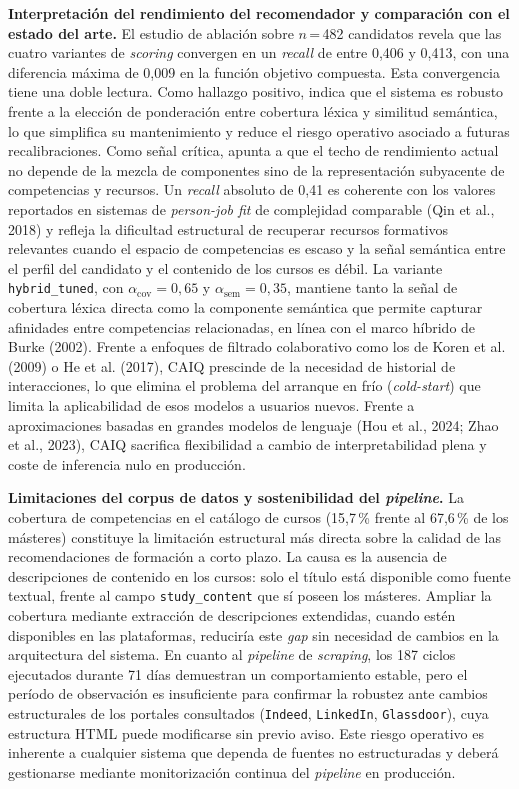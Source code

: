 \textbf{Interpretación del rendimiento del recomendador y comparación con el estado del arte.} El estudio de ablación sobre $n$\,=\,482 candidatos revela que las cuatro variantes de \textit{scoring} convergen en un \textit{recall} de entre 0,406 y 0,413, con una diferencia máxima de 0,009 en la función objetivo compuesta. Esta convergencia tiene una doble lectura. Como hallazgo positivo, indica que el sistema es robusto frente a la elección de ponderación entre cobertura léxica y similitud semántica, lo que simplifica su mantenimiento y reduce el riesgo operativo asociado a futuras recalibraciones. Como señal crítica, apunta a que el techo de rendimiento actual no depende de la mezcla de componentes sino de la representación subyacente de competencias y recursos. Un \textit{recall} absoluto de 0,41 es coherente con los valores reportados en sistemas de \textit{person-job fit} de complejidad comparable (Qin et al., 2018) y refleja la dificultad estructural de recuperar recursos formativos relevantes cuando el espacio de competencias es escaso y la señal semántica entre el perfil del candidato y el contenido de los cursos es débil. La variante \texttt{hybrid\_tuned}, con $\alpha_{\text{cov}}=0{,}65$ y $\alpha_{\text{sem}}=0{,}35$, mantiene tanto la señal de cobertura léxica directa como la componente semántica que permite capturar afinidades entre competencias relacionadas, en línea con el marco híbrido de Burke (2002). Frente a enfoques de filtrado colaborativo como los de Koren et al. (2009) o He et al. (2017), CAIQ prescinde de la necesidad de historial de interacciones, lo que elimina el problema del arranque en frío (\textit{cold-start}) que limita la aplicabilidad de esos modelos a usuarios nuevos. Frente a aproximaciones basadas en grandes modelos de lenguaje (Hou et al., 2024; Zhao et al., 2023), CAIQ sacrifica flexibilidad a cambio de interpretabilidad plena y coste de inferencia nulo en producción.

\textbf{Limitaciones del corpus de datos y sostenibilidad del \textit{pipeline}.} La cobertura de competencias en el catálogo de cursos (15,7\,\% frente al 67,6\,\% de los másteres) constituye la limitación estructural más directa sobre la calidad de las recomendaciones de formación a corto plazo. La causa es la ausencia de descripciones de contenido en los cursos: solo el título está disponible como fuente textual, frente al campo \texttt{study\_content} que sí poseen los másteres. Ampliar la cobertura mediante extracción de descripciones extendidas, cuando estén disponibles en las plataformas, reduciría este \textit{gap} sin necesidad de cambios en la arquitectura del sistema. En cuanto al \textit{pipeline} de \textit{scraping}, los 187 ciclos ejecutados durante 71 días demuestran un comportamiento estable, pero el período de observación es insuficiente para confirmar la robustez ante cambios estructurales de los portales consultados (\texttt{Indeed}, \texttt{LinkedIn}, \texttt{Glassdoor}), cuya estructura HTML puede modificarse sin previo aviso. Este riesgo operativo es inherente a cualquier sistema que dependa de fuentes no estructuradas y deberá gestionarse mediante monitorización continua del \textit{pipeline} en producción.

